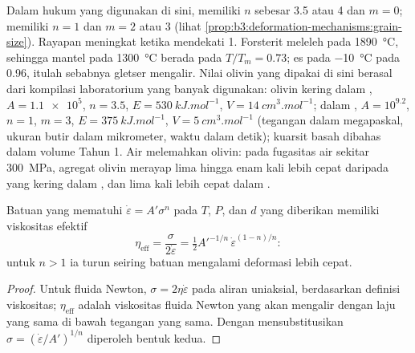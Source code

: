 Dalam hukum yang digunakan di sini,  memiliki $n$ sebesar 3.5 atau 4 dan $m = 0$;
 memiliki $n = 1$ dan $m = 2$ atau 3 (lihat \cref{prop:b3:deformation-mechanisms:grain-size}).
Rayapan meningkat ketika  mendekati 1. Forsterit meleleh pada \qty{1890}{\celsius}, sehingga mantel pada \qty{1300}{\celsius}
berada pada $T/T_m = 0.73$; es pada \qty{-10}{\celsius} pada 0.96, itulah sebabnya
gletser mengalir. Nilai olivin yang dipakai di sini berasal dari
kompilasi laboratorium yang banyak digunakan: olivin kering dalam , $A =
\num{1.1e5}$, $n = 3.5$, $E = \qty{530}{kJ.mol^{-1}}$, $V =
\qty{14}{cm^3.mol^{-1}}$; dalam , $A = 10^{9.2}$, $n = 1$, $m = 3$,
$E = \qty{375}{kJ.mol^{-1}}$, $V = \qty{5}{cm^3.mol^{-1}}$ (tegangan dalam megapaskal,
ukuran butir dalam mikrometer, waktu dalam detik); kuarsit basah dibahas
dalam volume Tahun 1. Air melemahkan olivin: pada fugasitas air sekitar
\qty{300}{MPa}, agregat olivin merayap lima hingga enam kali lebih cepat daripada yang kering
dalam , dan lima kali lebih cepat dalam .

\begin{proposition}\label{prop:b3:deformation-mechanisms:viscosity}
Batuan yang mematuhi  $\dot\varepsilon = A'\sigma^n$ pada $T$, $P$, dan
$d$ yang diberikan memiliki viskositas efektif
\[
  \eta_{\mathrm{eff}} = \frac{\sigma}{2\dot\varepsilon}
  = \tfrac12A'^{-1/n}\,\dot\varepsilon^{(1-n)/n}:
\]
untuk $n > 1$ ia turun seiring batuan mengalami deformasi lebih cepat.
\end{proposition}

\begin{proof}
Untuk fluida Newton, $\sigma = 2\eta\dot\varepsilon$ pada aliran uniaksial, berdasarkan
definisi viskositas; $\eta_{\mathrm{eff}}$ adalah viskositas fluida Newton yang
akan mengalir dengan laju yang sama di bawah tegangan yang sama. Dengan mensubstitusikan
$\sigma = (\dot\varepsilon/A')^{1/n}$ diperoleh bentuk kedua.
\end{proof}

